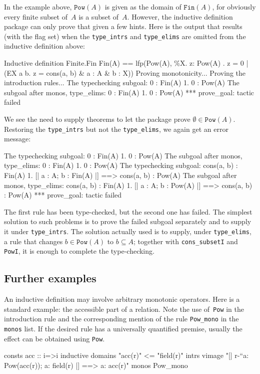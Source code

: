 In the example above, $\texttt{Pow}(A)$ is given as the domain of
$\texttt{Fin}(A)$, for obviously every finite subset of~$A$ is a subset
of~$A$.  However, the inductive definition package can only prove that given a
few hints.
Here is the output that results (with the flag set) when the
\texttt{type_intrs} and \texttt{type_elims} are omitted from the inductive
definition above:
\begin{ttbox}
Inductive definition Finite.Fin
Fin(A) ==
lfp(Pow(A),
    \%X. {z: Pow(A) . z = 0 | (EX a b. z = cons(a, b) & a : A & b : X)})
  Proving monotonicity...
\ttbreak
  Proving the introduction rules...
The typechecking subgoal:
0 : Fin(A)
 1. 0 : Pow(A)
\ttbreak
The subgoal after monos, type_elims:
0 : Fin(A)
 1. 0 : Pow(A)
*** prove_goal: tactic failed
\end{ttbox}
We see the need to supply theorems to let the package prove
$\emptyset\in\texttt{Pow}(A)$.  Restoring the \texttt{type_intrs} but not the
\texttt{type_elims}, we again get an error message:
\begin{ttbox}
The typechecking subgoal:
0 : Fin(A)
 1. 0 : Pow(A)
\ttbreak
The subgoal after monos, type_elims:
0 : Fin(A)
 1. 0 : Pow(A)
\ttbreak
The typechecking subgoal:
cons(a, b) : Fin(A)
 1. [| a : A; b : Fin(A) |] ==> cons(a, b) : Pow(A)
\ttbreak
The subgoal after monos, type_elims:
cons(a, b) : Fin(A)
 1. [| a : A; b : Pow(A) |] ==> cons(a, b) : Pow(A)
*** prove_goal: tactic failed
\end{ttbox}
The first rule has been type-checked, but the second one has failed.  The
simplest solution to such problems is to prove the failed subgoal separately
and to supply it under \texttt{type_intrs}.  The solution actually used is
to supply, under \texttt{type_elims}, a rule that changes
$b\in\texttt{Pow}(A)$ to $b\subseteq A$; together with \texttt{cons_subsetI}
and \texttt{PowI}, it is enough to complete the type-checking.



\subsection{Further examples}

An inductive definition may involve arbitrary monotonic operators.  Here is a
standard example: the accessible part of a relation.  Note the use
of~\texttt{Pow} in the introduction rule and the corresponding mention of the
rule \verb|Pow_mono| in the \texttt{monos} list.  If the desired rule has a
universally quantified premise, usually the effect can be obtained using
\texttt{Pow}.
\begin{ttbox}
consts  acc :: i=>i
inductive
  domains "acc(r)" <= "field(r)"
  intrs
    vimage  "[| r-``{a}: Pow(acc(r)); a: field(r) |] ==> a: acc(r)"
  monos      Pow_mono
\end{ttbox}

